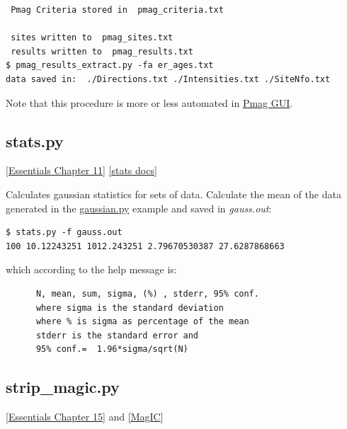 \documentclass[11pt]{book}
\begin{document}
{\begin{verbatim}
 Pmag Criteria stored in  pmag_criteria.txt

 sites written to  pmag_sites.txt
 results written to  pmag_results.txt
$ pmag_results_extract.py -fa er_ages.txt
data saved in:  ./Directions.txt ./Intensities.txt ./SiteNfo.txt
\end{verbatim}

Note that this procedure is more or less automated in \href{#pmag_gui.py}{Pmag GUI}.



\subsection{stats.py}
\href{http://earthref.org/MAGIC/books/Tauxe/Essentials/WebBook3ch11.html#ch11}{[Essentials Chapter 11]}
\href{https://github.com/PmagPy/PmagPy/blob/master/programs/stats.py}{[stats docs]}

Calculates gaussian statistics for sets of data.
Calculate the mean of the data generated in the \href{#gaussian.py}{gaussian.py} example and saved in {\it gauss.out}:

\begin{verbatim}
$ stats.py -f gauss.out
100 10.12243251 1012.243251 2.79670530387 27.6287868663
\end{verbatim}

which according to the help message is:

\begin{verbatim}
      N, mean, sum, sigma, (%) , stderr, 95% conf.
      where sigma is the standard deviation
      where % is sigma as percentage of the mean
      stderr is the standard error and
      95% conf.=  1.96*sigma/sqrt(N)
\end{verbatim}


\subsection{strip\_magic.py}
\href{http://earthref.org/MAGIC/books/Tauxe/Essentials/WebBook3ch15.html#ch15}{[Essentials Chapter 15]} and \href{#MagIC}{[MagIC}]

}
\end{document}
